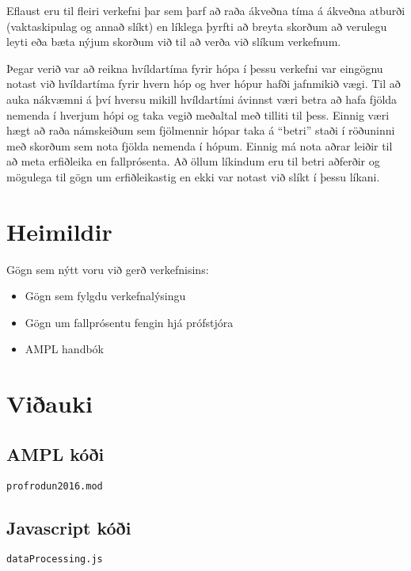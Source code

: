 \documentclass[12pt]{article}
\begin{document}
Eflaust eru til fleiri verkefni þar sem þarf að raða ákveðna tíma á ákveðna atburði (vaktaskipulag og annað slíkt) en líklega þyrfti að breyta skorðum að verulegu leyti eða bæta nýjum skorðum við til að verða við slíkum verkefnum.


\medskip
Þegar verið var að reikna hvíldartíma fyrir hópa í þessu verkefni var eingögnu notast við hvíldartíma fyrir hvern hóp og hver hópur hafði jafnmikið vægi. Til að auka nákvæmni á því hversu mikill hvíldartími ávinnst væri betra að hafa fjölda nemenda í hverjum hópi og taka vegið meðaltal með tilliti til þess. Einnig væri hægt að raða námskeiðum sem fjölmennir hópar taka á “betri” staði í röðuninni með skorðum sem nota fjölda nemenda í hópum. Einnig má nota aðrar leiðir til að meta erfiðleika en fallprósenta. Að öllum líkindum eru til betri aðferðir og mögulega til gögn um erfiðleikastig en ekki var notast við slíkt í þessu líkani.

\section{Heimildir}

Gögn sem nýtt voru við gerð verkefnisins:
\begin{itemize}
	\item Gögn sem fylgdu verkefnalýsingu
	\item Gögn um fallprósentu fengin hjá prófstjóra
	\item AMPL handbók
\end{itemize}

\newpage

\section{Viðauki}

\subsection{AMPL kóði}

\texttt{profrodun2016.mod}


\subsection{Javascript kóði}

\texttt{dataProcessing.js}

\end{document}
